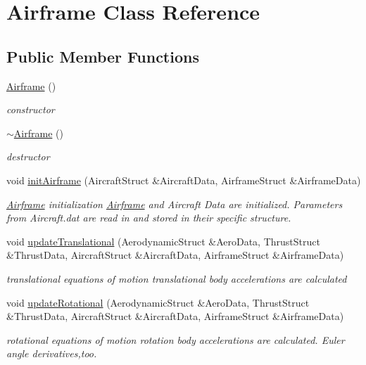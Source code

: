 \hypertarget{class_airframe}{}\section{Airframe Class Reference}
\label{class_airframe}
\subsection*{Public Member Functions}
\begin{DoxyCompactItemize}
\item 
\mbox{\label{class_airframe_a5e6632c7d0c5bc5b889de6cc2407944f}} 
\hyperlink{class_airframe_a5e6632c7d0c5bc5b889de6cc2407944f}{Airframe} ()
\begin{DoxyCompactList}\small\item\em constructor \end{DoxyCompactList}\item 
\mbox{\label{class_airframe_af849116afbf7c4d7d2d5c189ff68cb7d}} 
\hyperlink{class_airframe_af849116afbf7c4d7d2d5c189ff68cb7d}{$\sim$\+Airframe} ()
\begin{DoxyCompactList}\small\item\em destructor \end{DoxyCompactList}\item 
\mbox{\label{class_airframe_a57b5f7a74d11723186f34fc183e1581b}} 
void \hyperlink{class_airframe_a57b5f7a74d11723186f34fc183e1581b}{init\+Airframe} (Aircraft\+Struct \&Aircraft\+Data, Airframe\+Struct \&Airframe\+Data)
\begin{DoxyCompactList}\small\item\em \hyperlink{class_airframe}{Airframe} initialization \hyperlink{class_airframe}{Airframe} and Aircraft Data are initialized. Parameters from Aircraft.\+dat are read in and stored in their specific structure. \end{DoxyCompactList}\item 
void \hyperlink{class_airframe_ab3e18bd40fd5e68d793a164654a2821a}{update\+Translational} (Aerodynamic\+Struct \&Aero\+Data, Thrust\+Struct \&Thrust\+Data, Aircraft\+Struct \&Aircraft\+Data, Airframe\+Struct \&Airframe\+Data)
\begin{DoxyCompactList}\small\item\em translational equations of motion translational body accelerations are calculated \end{DoxyCompactList}\item 
void \hyperlink{class_airframe_af506bca34fa40f9ec0613b3be8f726eb}{update\+Rotational} (Aerodynamic\+Struct \&Aero\+Data, Thrust\+Struct \&Thrust\+Data, Aircraft\+Struct \&Aircraft\+Data, Airframe\+Struct \&Airframe\+Data)
\begin{DoxyCompactList}\small\item\em rotational equations of motion rotation body accelerations are calculated. Euler angle derivatives,too. \end{DoxyCompactList}\end{DoxyCompactItemize}



